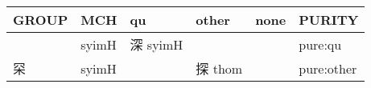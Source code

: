 \documentclass[14pt,a4paper]{scrartcl}
\begin{document}
\begin{longtable}[c]{@{}llllll@{}}
\toprule
\begin{minipage}[b]{0.14\columnwidth}\raggedright\strut
GROUP
\strut\end{minipage} &
\begin{minipage}[b]{0.14\columnwidth}\raggedright\strut
MCH
\strut\end{minipage} &
\begin{minipage}[b]{0.14\columnwidth}\raggedright\strut
qu
\strut\end{minipage} &
\begin{minipage}[b]{0.14\columnwidth}\raggedright\strut
other
\strut\end{minipage} &
\begin{minipage}[b]{0.14\columnwidth}\raggedright\strut
none
\strut\end{minipage} &
\begin{minipage}[b]{0.14\columnwidth}\raggedright\strut
PURITY
\strut\end{minipage}\tabularnewline
\midrule
\endhead
\begin{minipage}[t]{0.14\columnwidth}\raggedright\strut
𥥍
\strut\end{minipage} &
\begin{minipage}[t]{0.14\columnwidth}\raggedright\strut
syimH
\strut\end{minipage} &
\begin{minipage}[t]{0.14\columnwidth}\raggedright\strut
深 syimH
\strut\end{minipage} &
\begin{minipage}[t]{0.14\columnwidth}\raggedright\strut
\strut\end{minipage} &
\begin{minipage}[t]{0.14\columnwidth}\raggedright\strut
\strut\end{minipage} &
\begin{minipage}[t]{0.14\columnwidth}\raggedright\strut
pure:qu
\strut\end{minipage}\tabularnewline
\begin{minipage}[t]{0.14\columnwidth}\raggedright\strut
罙
\strut\end{minipage} &
\begin{minipage}[t]{0.14\columnwidth}\raggedright\strut
syimH
\strut\end{minipage} &
\begin{minipage}[t]{0.14\columnwidth}\raggedright\strut
\strut\end{minipage} &
\begin{minipage}[t]{0.14\columnwidth}\raggedright\strut
探 thom
\strut\end{minipage} &
\begin{minipage}[t]{0.14\columnwidth}\raggedright\strut
\strut\end{minipage} &
\begin{minipage}[t]{0.14\columnwidth}\raggedright\strut
pure:other
\strut\end{minipage}\tabularnewline
\bottomrule
\end{longtable}
\end{document}
